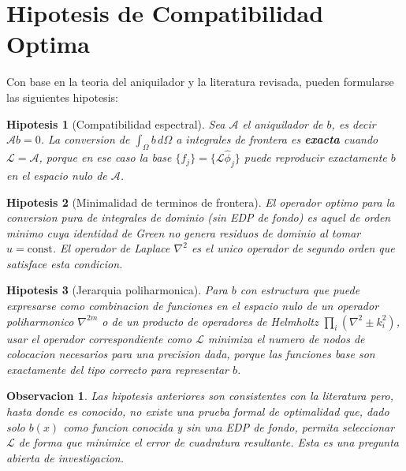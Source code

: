 \documentclass[12pt,a4paper]{article}
\newtheorem{hypothesis}{Hipotesis}
\newtheorem{remark}{Observacion}
\begin{document}
\section{Hipotesis de Compatibilidad Optima}

Con base en la teoria del aniquilador y la literatura revisada, pueden
formularse las siguientes hipotesis:

\begin{hypothesis}[Compatibilidad espectral]
\label{hyp:espectral}
Sea $\mathcal{A}$ el aniquilador de $b$, es decir $\mathcal{A}b = 0$. La
conversion de $\int_\Omega b\,d\Omega$ a integrales de frontera es
\textbf{exacta} cuando $\mathcal{L} = \mathcal{A}$, porque en ese caso la
base $\{f_j\} = \{\mathcal{L}\hat{\phi}_j\}$ puede reproducir exactamente
$b$ en el espacio nulo de $\mathcal{A}$.
\end{hypothesis}

\begin{hypothesis}[Minimalidad de terminos de frontera]
\label{hyp:minimalidad}
El operador optimo para la conversion pura de integrales de dominio (sin EDP
de fondo) es aquel de orden minimo cuya identidad de Green no genera residuos
de dominio al tomar $u = \text{const}$. El operador de Laplace $\nabla^2$ es
el unico operador de segundo orden que satisface esta condicion.
\end{hypothesis}

\begin{hypothesis}[Jerarquia poliharmonica]
\label{hyp:jerarquia}
Para $b$ con estructura que puede expresarse como combinacion de funciones en
el espacio nulo de un operador poliharmonico $\nabla^{2m}$ o de un producto
de operadores de Helmholtz $\prod_i(\nabla^2 \pm k_i^2)$, usar el operador
correspondiente como $\mathcal{L}$ minimiza el numero de nodos de colocacion
necesarios para una precision dada, porque las funciones base son exactamente
del tipo correcto para representar $b$.
\end{hypothesis}

\begin{remark}
Las hipotesis anteriores son consistentes con la literatura pero, hasta donde
es conocido, no existe una prueba formal de optimalidad que, dado solo $b(x)$
como funcion conocida y sin una EDP de fondo, permita seleccionar $\mathcal{L}$
de forma que minimice el error de cuadratura resultante. Esta es una pregunta
abierta de investigacion.
\end{remark}
\end{document}
